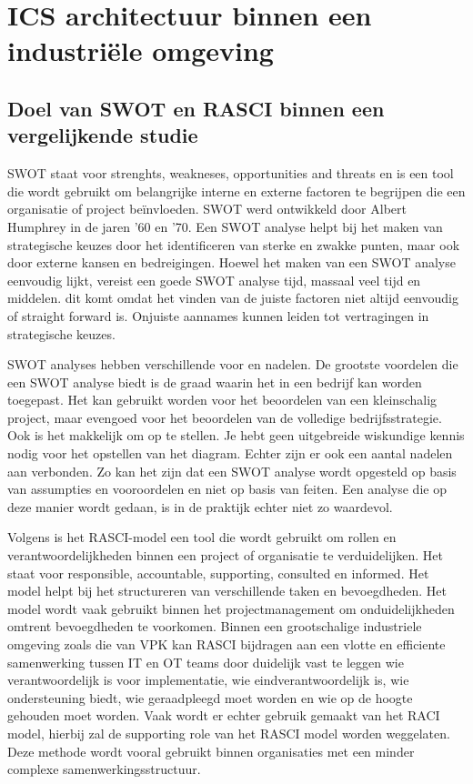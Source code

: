 \section{ICS architectuur binnen een industriële omgeving}

\subsection{Doel van SWOT en RASCI binnen een vergelijkende studie}
SWOT staat voor strenghts, weakneses, opportunities and threats en is een tool die wordt gebruikt om belangrijke interne en externe factoren te begrijpen die een organisatie of project beïnvloeden. SWOT werd ontwikkeld door Albert Humphrey in de jaren '60 en '70. Een SWOT analyse helpt bij het maken van strategische keuzes door het identificeren van sterke en zwakke punten, maar ook door externe kansen en bedreigingen. Hoewel het maken van een SWOT analyse eenvoudig lijkt, vereist een goede SWOT analyse tijd, massaal veel tijd en middelen. dit komt omdat het vinden van de juiste factoren niet altijd eenvoudig of straight forward is. Onjuiste aannames kunnen leiden tot vertragingen in strategische keuzes.\autocite{cipd2025}

SWOT analyses hebben verschillende voor en nadelen. De grootste voordelen die een SWOT analyse biedt is de graad waarin het in een bedrijf kan worden toegepast. Het kan gebruikt worden voor het beoordelen van een kleinschalig project, maar evengoed voor het beoordelen van de volledige bedrijfsstrategie. Ook is het makkelijk om op te stellen. Je hebt geen uitgebreide wiskundige kennis nodig voor het opstellen van het diagram. Echter zijn er ook een aantal nadelen aan verbonden. Zo kan het zijn dat een SWOT analyse wordt opgesteld op basis van assumpties en vooroordelen en niet op basis van feiten. Een analyse die op deze manier wordt gedaan, is in de praktijk echter niet zo waardevol. \autocite{sarsby2012}


Volgens \textcite{putman2024} is het RASCI-model een tool die wordt gebruikt om rollen en verantwoordelijkheden binnen een project of organisatie te verduidelijken. Het staat voor responsible, accountable, supporting, consulted en informed. Het model helpt bij het structureren van verschillende taken en bevoegdheden. Het model wordt vaak gebruikt binnen het projectmanagement om onduidelijkheden omtrent bevoegdheden te voorkomen. Binnen een grootschalige industriele omgeving zoals die van VPK kan RASCI bijdragen aan een vlotte en efficiente samenwerking tussen IT en OT teams door duidelijk vast te leggen wie verantwoordelijk is voor implementatie, wie eindverantwoordelijk is, wie ondersteuning biedt, wie geraadpleegd moet worden en wie op de hoogte gehouden moet worden. Vaak wordt er echter gebruik gemaakt van het RACI model, hierbij zal de supporting role van het RASCI model worden weggelaten. Deze methode wordt vooral gebruikt binnen organisaties met een minder complexe samenwerkingsstructuur. \autocite{harkhoe2025}





